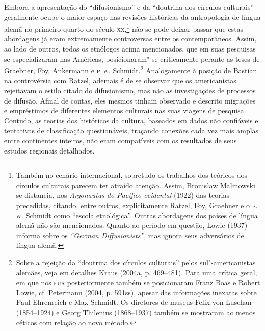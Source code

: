 Embora a apresentação do ``difusionismo'' e da ``doutrina dos círculos
culturais'' geralmente ocupe o maior espaço nas revisões históricas da
antropologia de língua alemã no primeiro quarto do século \textsc{xx},\footnote{Também
  no cenário internacional, sobretudo os trabalhos dos teóricos dos
  círculos culturais parecem ter atraído atenção. Assim, Bronisław
  Malinowski se distancia, nos \textit{Argonautas do Pacífico ocidental}
  (1922) das teorias precedidas, citando, entre outros, explicitamente
  Ratzel, Foy, Graebner e o \textsc{p}.\,\textsc{w}. Schmidt como ``escola etnológica''.
  Outras abordagens dos países de língua alemã não são mencionados.
  Quanto ao período em questão, Lowie (1937) informa sobre os
  \textit{``German Diffusionists''}, mas ignora seus adversários de língua
  alemã.} não se pode deixar passar que estas abordagens já eram
extremamente controversas entre os contemporâneos. Assim, ao lado de
outros, todos os etnólogos acima mencionados, que em suas pesquisas se
especializaram nas Américas, posicionaram"-se criticamente perante as
teses de Graebner, Foy, Ankermann e \textsc{p}.\,\textsc{w}. Schmidt.\footnote{Sobre a
  rejeição da ``doutrina dos círculos culturais'' pelos
  sul"-americanistas alemães, veja em detalhes Kraus (2004a, p.
  469--481). Para uma crítica geral, em que nos \textsc{eua} posteriormente também
  se posicionaram Franz Boas e Robert Lowie, cf. Petermann (2004, p.
  591ss), apesar das informações inexatas sobre Paul Ehrenreich e Max
  Schmidt. Os diretores de museus Felix von Luschan (1854--1924) e Georg
  Thilenius (1868--1937) também se mostraram ao menos céticos com relação
  ao novo método.} Analogamente à posição de Bastian na controvérsia com
Ratzel, ademais é de se observar que os americanistas rejeitavam o
estilo citado do difusionismo, mas não as investigações de processos de
difusão. Afinal de contas, eles mesmos tinham observado e descrito
migrações e empréstimos de diferentes elementos culturais nas suas
viagens de pesquisa. Contudo, as teorias dos históricos da cultura,
baseados em dados não confiáveis e tentativas de classificação
questionáveis, traçando conexões cada vez mais amplas entre continentes
inteiros, não eram compatíveis com os resultados de seus estudos
regionais detalhados.

